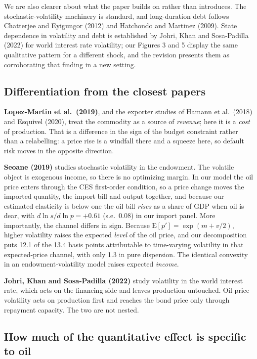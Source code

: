 We are also clearer about what the paper builds on rather than introduces. The
stochastic-volatility machinery is standard, and long-duration debt follows
Chatterjee and Eyigungor (2012) and Hatchondo and Martinez (2009). State
dependence in volatility and debt is established by Johri, Khan and
Sosa-Padilla (2022) for world interest rate volatility; our Figures 3 and 5
display the same qualitative pattern for a different shock, and the revision
presents them as corroborating that finding in a new setting.

\subsection*{Differentiation from the closest papers}

\textbf{Lopez-Martin et al.\ (2019)}, and the exporter studies of Hamann et al.\
(2018) and Esquivel (2020), treat the commodity as a source of \emph{revenue};
here it is a \emph{cost} of production. That is a difference in the sign of the
budget constraint rather than a relabelling: a price rise is a windfall there and
a squeeze here, so default risk moves in the opposite direction.

\textbf{Seoane (2019)} studies stochastic volatility in the endowment. The
volatile object is exogenous income, so there is no optimizing margin. In our
model the oil price enters through the CES first-order condition, so a price
change moves the imported quantity, the import bill and output together, and
because our estimated elasticity is below one the oil bill \emph{rises} as a
share of GDP when oil is dear, with $d\ln s/d\ln p = +0.61$ (s.e.\ 0.08) in our
import panel. More importantly, the channel differs in sign. Because
$\mathrm{E}[p'] = \exp(m + v/2)$, higher volatility raises the expected
\emph{level} of the oil price, and our decomposition puts 12.1 of the 13.4 basis
points attributable to time-varying volatility in that expected-price channel,
with only 1.3 in pure dispersion. The identical convexity in an
endowment-volatility model raises expected \emph{income}.

\textbf{Johri, Khan and Sosa-Padilla (2022)} study volatility in the world
interest rate, which acts on the financing side and leaves production untouched.
Oil price volatility acts on production first and reaches the bond price only
through repayment capacity. The two are not nested.

\subsection*{How much of the quantitative effect is specific to oil}


